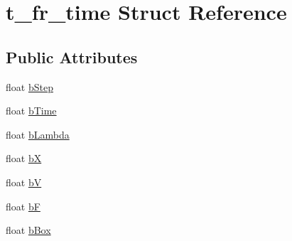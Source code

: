 \hypertarget{structt__fr__time}{\section{t\-\_\-fr\-\_\-time \-Struct \-Reference}
\label{structt__fr__time}
}
\subsection*{\-Public \-Attributes}
\begin{DoxyCompactItemize}
\item 
float \hyperlink{structt__fr__time_afb96ea6d6e523c32d3603bdf63348496}{b\-Step}
\item 
float \hyperlink{structt__fr__time_a45f5e2c7ef45e8a51075a75aeb9c86fe}{b\-Time}
\item 
float \hyperlink{structt__fr__time_af2f581e618ca2de05c6b63e82c52c645}{b\-Lambda}
\item 
float \hyperlink{structt__fr__time_afd6e2805a976f95f7b98a898f034a327}{b\-X}
\item 
float \hyperlink{structt__fr__time_a9f167a43051024761f6ccd87321f95de}{b\-V}
\item 
float \hyperlink{structt__fr__time_a25d7fcfdf6586d57878925632f3e2e9e}{b\-F}
\item 
float \hyperlink{structt__fr__time_a05794688d12d34c121f33f47f8f93452}{b\-Box}
\end{DoxyCompactItemize}


